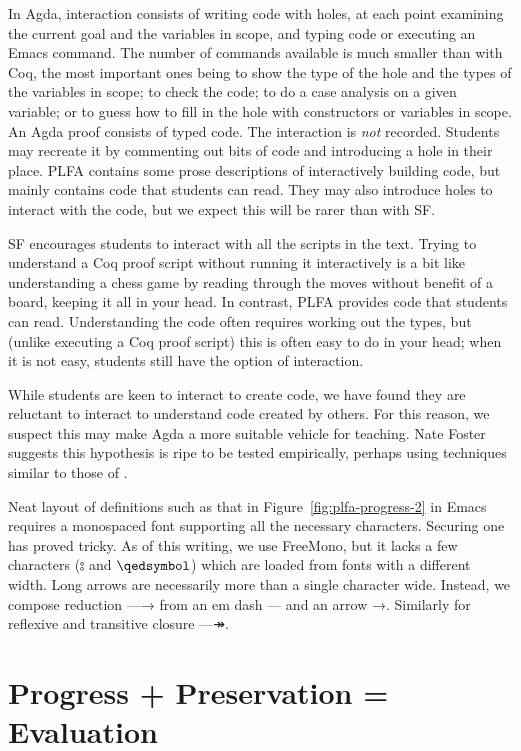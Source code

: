 \documentclass[preprint,authoryear]{elsarticle}
\begin{document}
In Agda, interaction consists of writing code with holes, at each
point examining the current goal and the variables in scope, and
typing code or executing an Emacs command.  The number of commands
available is much smaller than with Coq, the most important ones being
to show the type of the hole and the types of the variables in scope;
to check the code; to do a case analysis on a given variable; or to
guess how to fill in the hole with constructors or variables in scope.
An Agda proof consists of typed code.  The interaction is \emph{not}
recorded.  Students may recreate it by commenting out bits of code and
introducing a hole in their place.   PLFA contains some prose descriptions
of interactively building code, but mainly contains code that students
can read.  They may also introduce holes to interact with the code, but
we expect this will be rarer than with SF.

SF encourages students to interact with all the scripts in the text.
Trying to understand a Coq proof script without running it
interactively is a bit like understanding a chess game by reading
through the moves without benefit of a board, keeping it all in your
head.  In contrast, PLFA provides code that students can read.
Understanding the code often requires working out the types, but
(unlike executing a Coq proof script) this is often easy to do in your
head; when it is not easy, students still have the option of
interaction.

While students are keen to interact to create code, we have found they
are reluctant to interact to understand code created by others. For
this reason, we suspect this may make Agda a more suitable vehicle for
teaching.  Nate Foster suggests this hypothesis is ripe to be tested
empirically, perhaps using techniques similar to those of
\citet{Danas-et-al-2017}.

Neat layout of definitions such as that in
Figure~\ref{fig:plfa-progress-2} in Emacs requires a monospaced font
supporting all the necessary characters.  Securing one has proved
tricky. As of this writing, we use FreeMono, but it lacks a few
characters ($\typecolon$ and $\qedsymbol$) which are loaded from fonts with a different
width.  Long arrows are necessarily more than a single character wide.
Instead, we compose reduction —→ from an em dash — and an arrow →.
Similarly for reflexive and transitive closure —↠.

\section{Progress + Preservation = Evaluation}
\end{document}
